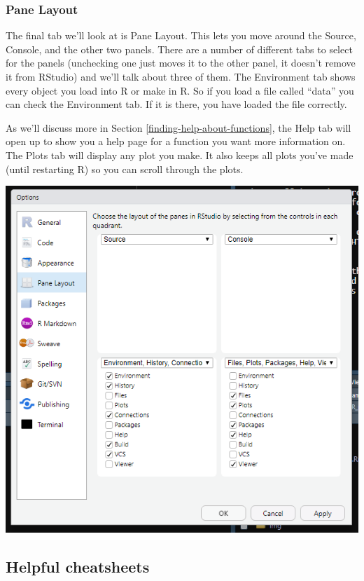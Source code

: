 \documentclass[
  12pt,
]{book}
\begin{document}
\hypertarget{pane-layout}{%
\subsubsection{Pane Layout}\label{pane-layout}}

The final tab we'll look at is Pane Layout. This lets you move around the Source, Console, and the other two panels. There are a number of different tabs to select for the panels (unchecking one just moves it to the other panel, it doesn't remove it from RStudio) and we'll talk about three of them. The Environment tab shows every object you load into R or make in R. So if you load a file called ``data'' you can check the Environment tab. If it is there, you have loaded the file correctly.

As we'll discuss more in Section \ref{finding-help-about-functions}, the Help tab will open up to show you a help page for a function you want more information on. The Plots tab will display any plot you make. It also keeps all plots you've made (until restarting R) so you can scroll through the plots.

\includegraphics{images/rstudio_9.PNG}

\hypertarget{helpful-cheatsheets}{%
\subsection{Helpful cheatsheets}\label{helpful-cheatsheets}}
\end{document}
